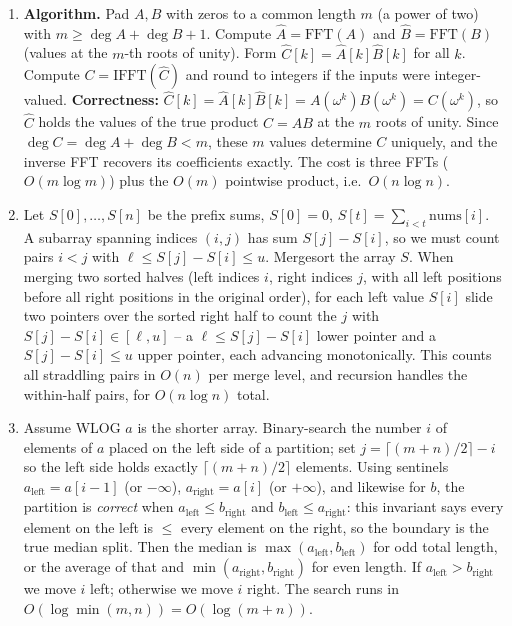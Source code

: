 \documentclass[11pt]{article}
\begin{document}
\begin{enumerate}[label=\textbf{A\arabic*.}, leftmargin=2.2em]
\item \textbf{Algorithm.} Pad $A, B$ with zeros to a common length $m$ (a power of two) with
$m \ge \deg A + \deg B + 1$. Compute $\hat A = \text{FFT}(A)$ and $\hat B = \text{FFT}(B)$
(values at the $m$-th roots of unity). Form $\hat C[k] = \hat A[k]\hat B[k]$ for all $k$.
Compute $C = \text{IFFT}(\hat C)$ and round to integers if the inputs were integer-valued.
\textbf{Correctness:} $\hat C[k] = \hat A[k]\hat B[k] = A(\omega^k) B(\omega^k) = C(\omega^k)$,
so $\hat C$ holds the values of the true product $C = AB$ at the $m$ roots of unity. Since
$\deg C = \deg A + \deg B < m$, these $m$ values determine $C$ uniquely, and the inverse FFT
recovers its coefficients exactly. The cost is three FFTs ($O(m \log m)$) plus the $O(m)$
pointwise product, i.e.\ $O(n \log n)$.

\item Let $S[0], \ldots, S[n]$ be the prefix sums, $S[0] = 0$, $S[t] = \sum_{i<t}
\text{nums}[i]$. A subarray spanning indices $(i, j)$ has sum $S[j] - S[i]$, so we must count
pairs $i < j$ with $\ell \le S[j] - S[i] \le u$. Mergesort the array $S$. When merging two
sorted halves (left indices $i$, right indices $j$, with all left positions before all right
positions in the original order), for each left value $S[i]$ slide two pointers over the
sorted right half to count the $j$ with $S[j] - S[i] \in [\ell, u]$ -- a $\ell \le S[j]-S[i]$
lower pointer and a $S[j]-S[i] \le u$ upper pointer, each advancing monotonically. This counts
all straddling pairs in $O(n)$ per merge level, and recursion handles the within-half pairs,
for $O(n \log n)$ total.

\item Assume WLOG $a$ is the shorter array. Binary-search the number $i$ of elements of $a$
placed on the left side of a partition; set $j = \lceil (m+n)/2\rceil - i$ so the left side
holds exactly $\lceil(m+n)/2\rceil$ elements. Using sentinels $a_{\text{left}} = a[i-1]$ (or
$-\infty$), $a_{\text{right}} = a[i]$ (or $+\infty$), and likewise for $b$, the partition is
\emph{correct} when $a_{\text{left}} \le b_{\text{right}}$ and $b_{\text{left}} \le
a_{\text{right}}$: this invariant says every element on the left is $\le$ every element on the
right, so the boundary is the true median split. Then the median is $\max(a_{\text{left}},
b_{\text{left}})$ for odd total length, or the average of that and $\min(a_{\text{right}},
b_{\text{right}})$ for even length. If $a_{\text{left}} > b_{\text{right}}$ we move $i$ left;
otherwise we move $i$ right. The search runs in $O(\log \min(m,n)) = O(\log(m+n))$.

\end{enumerate}
\end{document}
